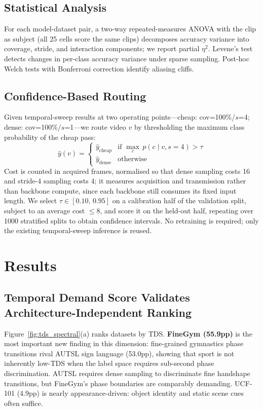 \documentclass[a4paper, 10pt, conference]{ieeeconf}
\newcommand{\TDS}{\textsc{TDS}}
\begin{document}
\subsection{Statistical Analysis}

For each model-dataset pair, a two-way repeated-measures ANOVA with the clip as subject (all 25 cells score the same clips) decomposes accuracy variance into coverage, stride, and interaction components; we report partial $\eta^2$. Levene's test detects changes in per-class accuracy variance under sparse sampling. Post-hoc Welch tests with Bonferroni correction identify aliasing cliffs.

\subsection{Confidence-Based Routing}

Given temporal-sweep results at two operating points---cheap: cov=100\%/$s$=4; dense: cov=100\%/$s$=1---we route video $v$ by thresholding the maximum class probability of the cheap pass: \[ \hat{y}(v) = \begin{cases}
    \hat{y}_\text{cheap} & \text{if } \max_c\,p(c\mid v,s{=}4) > \tau \\
    \hat{y}_\text{dense} & \text{otherwise}
  \end{cases}
\] Cost is counted in acquired frames, normalised so that dense sampling costs 16 and stride-4 sampling costs 4; it measures acquisition and transmission rather than backbone compute, since each backbone still consumes its fixed input length. We select $\tau\in[0.10,\,0.95]$ on a calibration half of the validation split, subject to an average cost $\leq8$, and score it on the held-out half, repeating over 1000 stratified splits to obtain confidence intervals. No retraining is required; only the existing temporal-sweep inference is reused.

\section{Results}
\label{sec:results}

\subsection{Temporal Demand Score Validates Architecture-Independent Ranking}
\label{sec:results_tds}

Figure~\ref{fig:tds_spectral}(a) ranks datasets by \TDS{}. \textbf{FineGym (55.9pp)} is the most important new finding in this dimension: fine-grained gymnastics phase transitions rival AUTSL sign language (53.0pp), showing that sport is not inherently low-\TDS{} when the label space requires sub-second phase discrimination. AUTSL requires dense sampling to discriminate fine handshape transitions, but FineGym's phase boundaries are comparably demanding. UCF-101 (4.9pp) is nearly appearance-driven: object identity and static scene cues often suffice.
\end{document}
